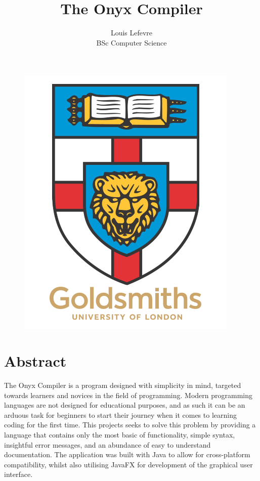 \documentclass[
]{report}
\title{The Onyx Compiler}
\author{Louis Lefevre\\BSc Computer Science}
\date{}
\begin{document}
\thispagestyle{empty}

\begin{figure}
	\includegraphics[scale=0.6]{goldsmiths-logo}
	\centering
	\maketitle
\end{figure}

\chapter*{Abstract}
The Onyx Compiler is a program designed with simplicity in mind,
targeted towards learners and novices in the field of programming.
Modern programming languages are not designed for educational purposes,
and as such it can be an arduous task for beginners to start their
journey when it comes to learning coding for the first time. This
projects seeks to solve this problem by providing a language that
contains only the most basic of functionality, simple syntax, insightful
error messages, and an abundance of easy to understand documentation.
The application was built with Java to allow for cross-platform
compatibility, whilst also utilising JavaFX for development of the
graphical user interface.
\end{document}
